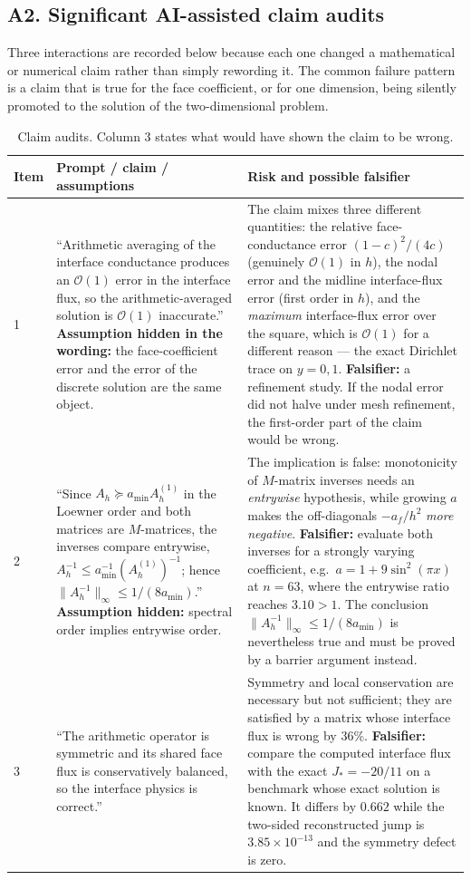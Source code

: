 \subsection*{A2. Significant AI-assisted claim audits}

Three interactions are recorded below because each one changed a mathematical
or numerical claim rather than simply rewording it. The common failure pattern
is a claim that is true for the face coefficient, or for one dimension, being
silently promoted to the solution of the two-dimensional problem.

\begin{table}[H]
\centering\small
\caption{Claim audits. Column 3 states what would have shown the claim to be
wrong.}
\label{tab:ai_audits}
\begin{tabular}{@{}p{0.95cm}p{7.4cm}p{5.8cm}@{}}
\toprule
Item & Prompt / claim / assumptions & Risk and possible falsifier \\
\midrule
1 &
``Arithmetic averaging of the interface conductance produces an
$\mathcal{O}(1)$ error in the interface flux, so the arithmetic-averaged
solution is $\mathcal{O}(1)$ inaccurate.''
\textbf{Assumption hidden in the wording:} the face-coefficient error and the
error of the discrete solution are the same object. &
The claim mixes three different quantities: the relative face-conductance
error $(1-c)^2/(4c)$ (genuinely $\mathcal{O}(1)$ in $h$), the nodal error and
the midline interface-flux error (first order in $h$), and the \emph{maximum}
interface-flux error over the square, which is $\mathcal{O}(1)$ for a different
reason --- the exact Dirichlet trace on $y=0,1$. \textbf{Falsifier:} a
refinement study. If the nodal error did not halve under mesh refinement, the
first-order part of the claim would be wrong. \\
2 &
``Since $A_h \succeq a_{\min}A_h^{(1)}$ in the Loewner order and both matrices
are $M$-matrices, the inverses compare entrywise,
$A_h^{-1}\le a_{\min}^{-1}(A_h^{(1)})^{-1}$; hence
$\|A_h^{-1}\|_\infty\le 1/(8a_{\min})$.'' \textbf{Assumption hidden:}
spectral order implies entrywise order. &
The implication is false: monotonicity of $M$-matrix inverses needs an
\emph{entrywise} hypothesis, while growing $a$ makes the off-diagonals
$-a_f/h^2$ \emph{more negative}. \textbf{Falsifier:} evaluate both inverses for
a strongly varying coefficient, e.g.\ $a=1+9\sin^2(\pi x)$ at $n=63$, where the
entrywise ratio reaches $3.10>1$. The conclusion
$\|A_h^{-1}\|_\infty\le1/(8a_{\min})$ is nevertheless true and must be proved by
a barrier argument instead. \\
3 &
``The arithmetic operator is symmetric and its shared face flux is
conservatively balanced, so the interface physics is correct.'' &
Symmetry and local conservation are necessary but not sufficient; they are
satisfied by a matrix whose interface flux is wrong by $36\%$.
\textbf{Falsifier:} compare the computed interface flux with the exact
$J_*=-20/11$ on a benchmark whose exact solution is known. It differs by
$0.662$ while the two-sided reconstructed jump is $3.85\times10^{-13}$ and the
symmetry defect is zero. \\
\bottomrule
\end{tabular}
\end{table}

